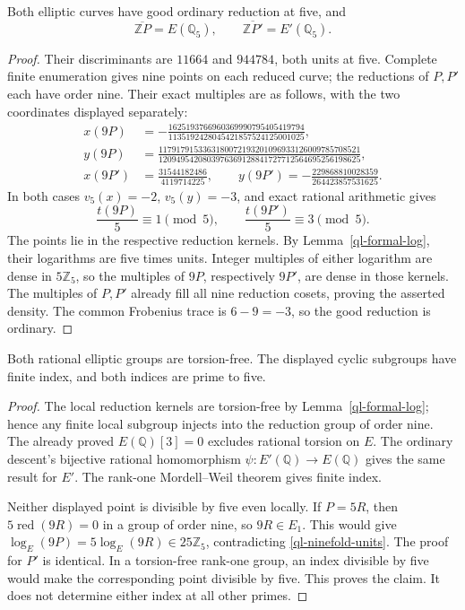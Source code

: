 \begin{theorem}\label{ql-elliptic-density}
Both elliptic curves have good ordinary reduction at five, and
\[
 \overline{\mathbb ZP}=E(\mathbb Q_5),\qquad
 \overline{\mathbb ZP'}=E'(\mathbb Q_5).
\]
\end{theorem}
\begin{proof}
Their discriminants are \(11664\) and \(944784\), both units at five.
Complete finite enumeration gives nine points on each reduced curve;
the reductions of \(P,P'\) each have order nine. Their exact multiples
are as follows, with the two coordinates displayed separately:
\begin{align*}
 x(9P)&=-\frac{1625193766960369990795405419794}
                   {1135192428045421857524125001025},\\
 y(9P)&=\frac{1179179153363180072193201096933126009785708521}
                  {1209495420803976369128841727712564695256198625},\\
 x(9P')&=\frac{31544182486}{4119714225},\qquad
 y(9P')=-\frac{229868810028359}{264423857531625}.
\end{align*}
In both cases \(v_5(x)=-2\), \(v_5(y)=-3\), and exact rational
arithmetic gives
\begin{equation}\label{ql-ninefold-units}
 \frac{t(9P)}5\equiv1\pmod5,\qquad
 \frac{t(9P')}5\equiv3\pmod5.
\end{equation}
The points lie in the respective reduction kernels. By
Lemma~\ref{ql-formal-log}, their logarithms are five times units.
Integer multiples of either logarithm are dense in \(5\mathbb Z_5\),
so the multiples of \(9P\), respectively \(9P'\), are dense in those
kernels. The multiples of \(P,P'\) already fill all nine reduction
cosets, proving the asserted density. The common Frobenius trace is
\(6-9=-3\), so the good reduction is ordinary.
\end{proof}

\begin{corollary}\label{ql-elliptic-saturation}
Both rational elliptic groups are torsion-free. The displayed cyclic
subgroups have finite index, and both indices are prime to five.
\end{corollary}
\begin{proof}
The local reduction kernels are torsion-free by
Lemma~\ref{ql-formal-log}; hence any finite local subgroup injects into
the reduction group of order nine. The already proved
\(E(\mathbb Q)[3]=0\) excludes rational torsion on \(E\).
The ordinary descent's bijective rational homomorphism
\(\psi:E'(\mathbb Q)\to E(\mathbb Q)\) gives the same result for \(E'\).
The rank-one Mordell--Weil theorem gives finite index.

Neither displayed point is divisible by five even locally. If \(P=5R\),
then \(5\operatorname{red}(9R)=0\) in a group of order nine, so
\(9R\in E_1\). This would give
\(\log_E(9P)=5\log_E(9R)\in25\mathbb Z_5\), contradicting
\eqref{ql-ninefold-units}. The proof for \(P'\) is identical.
In a torsion-free rank-one group, an index divisible by five would
make the corresponding point divisible by five. This proves the claim.
It does not determine either index at all other primes.
\end{proof}

